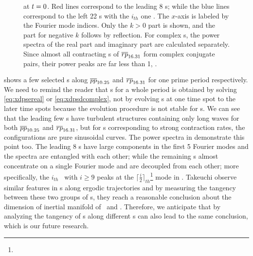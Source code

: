 \documentclass[final,leqno,onefignum,onetabnum]{siamltexmm}
\begin{document}
\begin{figure}[h]
{    at $t=0$. Red lines correspond to the leading 8 \Fv s; while
    the blue lines correspond to the left 22 \Fv s with the $i_{th}$ one
    .
    The $x$-axis is
    labeled by the Fourier mode indices.
    Only the $k>0$ part is shown, and the part for
    negative $k$ follows by reflection. For complex \Fv s, the
    power spectra of the real part and imaginary part are calculated
    separately. Since almost all contracting \Fv s of ${\overline{rp}}_{16.31}$
    form complex conjugate pairs, their power peaks are far less than 1,
    .
  }
  \label{fig:FVpower}
\end{figure}
 shows a few selected \Fv s along ${\overline{pp}}_{10.25}$
and ${\overline{rp}}_{16.31}$ for one prime period respectively. We need to
remind the reader that \Fv s for a whole period is obtained by solving
\eqref{eq:xdpsereal} or \eqref{eq:xdpsdcomplex}, not by evolving
\Fv s at one time spot to the later time spots because the evolution
procedure is not stable  for \Fv s. We can see that the leading
few \Fv s have turbulent structures containing only long waves
for both ${\overline{pp}}_{10.25}$ and ${\overline{rp}}_{16.31}$, but for
\Fv s corresponding to strong contraction rates, the configurations
are pure sinusoidal curves. The power spectra in 
demonstrate this point too. The leading 8 \Fv s have large components in
the first 5 Fourier modes and the spectra are entangled with each other;
while the remaining \Fv s almost concentrate
on a single Fourier mode and are decoupled from each other;
more specifically, the $i_{th}$ \Fv\ with $i\ge 9$
peaks at the $\lceil \frac{i}{2} \rceil_{th}$\footnote{}
mode in .
Takeuchi \edit{\etal} observe similar
features in \cLv s along ergodic
trajectories and by measuring the tangency between these two groups of
\cLv s, they reach a reasonable conclusion about the dimension of
inertial manifold of \KSe\ and \cGLe.
Therefore, we anticipate that by analyzing the tangency of \Fv s along
different \po s can also lead to the same conclusion, which is our
future research.
\end{document}
